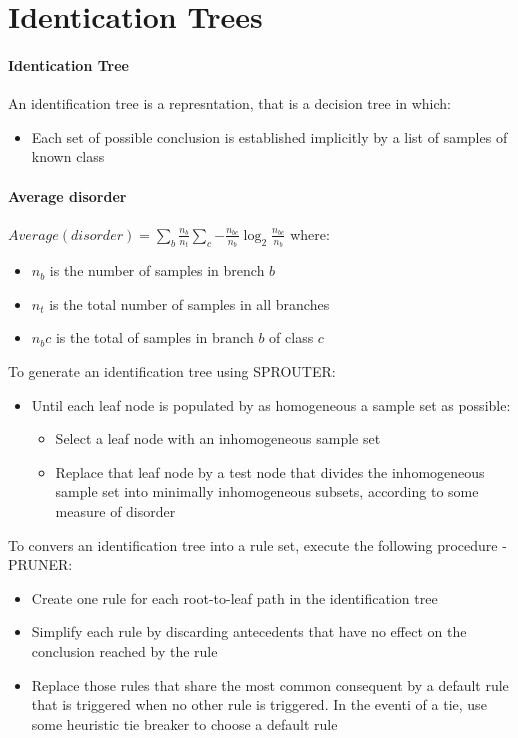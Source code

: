 \section{Identication Trees}

\paragraph{Identication Tree} An identification tree is a
represntation, that is a decision tree in which:
\begin{itemize}
  \item Each set of possible conclusion is established implicitly
    by a list of samples of known class
\end{itemize}

\paragraph{Average disorder}
\begin{math}
  Average(disorder) =
  \sum_{b}{\frac{n_b}{n_t} \sum_{c}{-\frac{n_{bc}}{n_b}\log_{2}\frac{n_{bc}}{n_b}}}
\end{math}
where:
\begin{itemize}
  \item $n_b$ is the number of samples in brench $b$
  \item $n_t$ is the total number of samples in all branches
  \item $n_bc$ is the total of samples in branch $b$ of class $c$
\end{itemize}

To generate an identification tree using SPROUTER:
\begin{itemize}
  \item Until each leaf node is populated by as homogeneous a
    sample set as possible:
    \begin{itemize}
      \item Select a leaf node with an inhomogeneous sample set
      \item Replace that leaf node by a test node that divides the
        inhomogeneous sample set into minimally inhomogeneous
        subsets, according to some measure of disorder
    \end{itemize}
\end{itemize}

To convers an identification tree into a rule set, execute the
following procedure - PRUNER:
\begin{itemize}
  \item Create one rule for each root-to-leaf path in the
    identification tree
  \item Simplify each rule by discarding antecedents that have no
    effect on the conclusion reached by the rule
  \item Replace those rules that share the most common consequent
    by a default rule that is triggered when no other rule is
    triggered. In the eventi of a tie, use some heuristic tie
    breaker to choose a default rule
\end{itemize}


